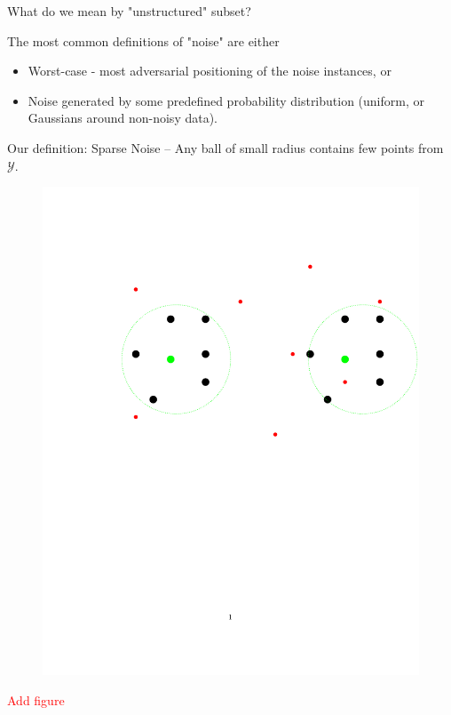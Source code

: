 \documentclass{beamer}
\newcommand{\mc}{\mathcal}
\begin{document}
\begin{frame}
{What do we mean by "unstructured" subset?}

The most common definitions of "noise" are either 

\begin{itemize}

\item Worst-case - most adversarial positioning
of the noise instances, or

\vspace{1cm}

\item Noise generated by some predefined probability distribution (uniform, or Gaussians around non-noisy data).

\end{itemize}
\end{frame}

\begin{frame}
{Our definition: \alert {Sparse Noise}  -- Any ball of small radius contains few points from $\mc Y$.}
    \begin{figure}
	  \includegraphics[trim = 100 0 0 100, clip, width=\linewidth]{2.pdf}
   \end{figure}
    	 
	\textcolor{red}{Add figure}

\end{frame}
\end{document}
